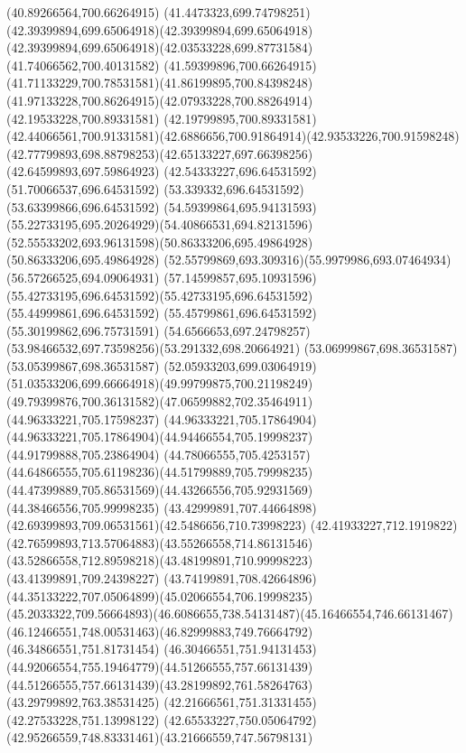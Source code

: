 {{\closepath
\moveto(40.89266564,700.66264915)
\curveto(41.4473323,699.74798251)(42.39399894,699.65064918)(42.39399894,699.65064918)
\curveto(42.39399894,699.65064918)(42.03533228,699.87731584)(41.74066562,700.40131582)
\curveto(41.59399896,700.66264915)(41.71133229,700.78531581)(41.86199895,700.84398248)
\curveto(41.97133228,700.86264915)(42.07933228,700.88264914)(42.19533228,700.89331581)
\lineto(42.19799895,700.89331581)
\curveto(42.44066561,700.91331581)(42.6886656,700.91864914)(42.93533226,700.91598248)
\curveto(42.77799893,698.88798253)(42.65133227,697.66398256)(42.64599893,697.59864923)
\lineto(42.54333227,696.64531592)
\lineto(51.70066537,696.64531592)
\lineto(53.339332,696.64531592)
\lineto(53.63399866,696.64531592)
\curveto(54.59399864,695.94131593)(55.22733195,695.20264929)(54.40866531,694.82131596)
\curveto(52.55533202,693.96131598)(50.86333206,695.49864928)(50.86333206,695.49864928)
\curveto(52.55799869,693.309316)(55.9979986,693.07464934)(56.57266525,694.09064931)
\curveto(57.14599857,695.10931596)(55.42733195,696.64531592)(55.42733195,696.64531592)
\lineto(55.44999861,696.64531592)
\lineto(55.45799861,696.64531592)
\lineto(55.30199862,696.75731591)
\curveto(54.6566653,697.24798257)(53.98466532,697.73598256)(53.291332,698.20664921)
\lineto(53.06999867,698.36531587)
\lineto(53.05399867,698.36531587)
\curveto(52.05933203,699.03064919)(51.03533206,699.66664918)(49.99799875,700.21198249)
\curveto(49.79399876,700.36131582)(47.06599882,702.35464911)(44.96333221,705.17598237)
\lineto(44.96333221,705.17864904)
\curveto(44.96333221,705.17864904)(44.94466554,705.19998237)(44.91799888,705.23864904)
\curveto(44.78066555,705.4253157)(44.64866555,705.61198236)(44.51799889,705.79998235)
\curveto(44.47399889,705.86531569)(44.43266556,705.92931569)(44.38466556,705.99998235)
\curveto(43.42999891,707.44664898)(42.69399893,709.06531561)(42.5486656,710.73998223)
\curveto(42.41933227,712.1919822)(42.76599893,713.57064883)(43.55266558,714.86131546)
\curveto(43.52866558,712.89598218)(43.48199891,710.99998223)(43.41399891,709.24398227)
\curveto(43.74199891,708.42664896)(44.35133222,707.05064899)(45.02066554,706.19998235)
\curveto(45.2033322,709.56664893)(46.6086655,738.54131487)(45.16466554,746.66131467)
\curveto(46.12466551,748.00531463)(46.82999883,749.76664792)(46.34866551,751.81731454)
\curveto(46.30466551,751.94131453)(44.92066554,755.19464779)(44.51266555,757.66131439)
\curveto(44.51266555,757.66131439)(43.28199892,761.58264763)(43.29799892,763.38531425)
\lineto(42.21666561,751.31331455)
\lineto(42.27533228,751.13998122)
\curveto(42.65533227,750.05064792)(42.95266559,748.83331461)(43.21666559,747.56798131)
}}
